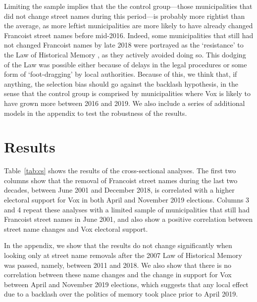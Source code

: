 \documentclass[12pt, notitlepage]{article}
\begin{document}
Limiting the sample implies that the the control group---those municipalities that did not change street names during this period---is probably more rightist than the average, as more leftist municipalities are more likely to have already changed Francoist street names before mid-2016.
Indeed, some municipalities that still had not changed Francoist names by late 2018 were portrayed as the `resistance' to the Law of Historical Memory \citep{Blanco-Elipe:2018aa}, as they actively avoided doing so.
This dodging of the Law was possible either because of delays in the legal procedures or some form of `foot-dragging' by local authorities.
Because of this, we think that, if anything, the selection bias should go against the backlash hypothesis, in the sense that the control group is comprised by municipalities where Vox is likely to have grown more between 2016 and 2019.
We also include a series of additional models in the appendix to test the robustness of the results.


\section*{Results}

Table~\ref{tab:cs} shows the results of the cross-sectional analyses.
The first two columns show that the removal of Francoist street names during the last two decades, between June 2001 and December 2018, is correlated with a higher electoral support for Vox in both April and November 2019 elections.
Columns 3 and 4 repeat these analyses with a limited sample of municipalities that still had Francoist street names in June 2001, and also show a positive correlation between street name changes and Vox electoral support.



In the appendix, we show that the results do not change significantly when looking only at street name removals after the 2007 Law of Historical Memory was passed, namely, between 2011 and 2018.
We also show that there is no correlation between these name changes and the change in support for Vox between April and November 2019 elections, which suggests that any local effect due to a backlash over the politics of memory took place prior to April 2019.
\end{document}
